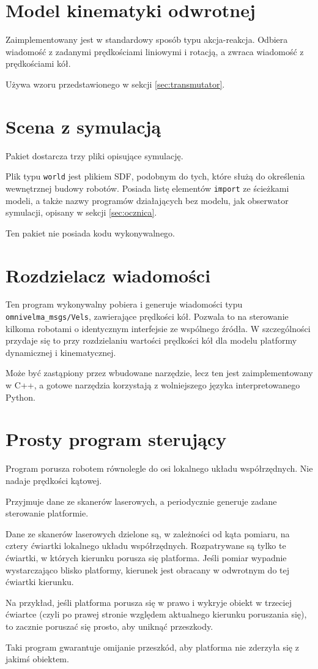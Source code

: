 \section{Model kinematyki odwrotnej}
	Zaimplementowany jest w standardowy sposób typu akcja-reakcja.
	Odbiera wiadomość z zadanymi prędkościami liniowymi i rotacją, a zwraca wiadomość z prędkościami kół.
	
	Używa wzoru przedstawionego w sekcji \ref{sec:transmutator}.
	
\section{Scena z symulacją}
	Pakiet dostarcza trzy pliki opisujące symulację.

	Plik typu \texttt{world} jest plikiem SDF, podobnym do tych, które służą do określenia wewnętrznej budowy robotów.
	Posiada listę elementów \texttt{import} ze ścieżkami modeli, a także nazwy programów działających bez modelu, jak obserwator symulacji, opisany w sekcji \ref{sec:ocznica}.
	
	Ten pakiet nie posiada kodu wykonywalnego.

\section{Rozdzielacz wiadomości}
	Ten program wykonywalny pobiera i generuje wiadomości typu \texttt{omnivelma\_msgs/Vels}, zawierające prędkości kół.
	Pozwala to na sterowanie kilkoma robotami o identycznym interfejsie ze wspólnego źródła.
	W szczególności przydaje się to przy rozdzielaniu wartości prędkości kół dla modelu platformy dynamicznej i kinematycznej.
	
	Może być zastąpiony przez wbudowane narzędzie, lecz ten jest zaimplementowany w C++, a gotowe narzędzia korzystają z wolniejszego języka interpretowanego Python.

\section{Prosty program sterujący}
	Program porusza robotem równolegle do osi lokalnego układu współrzędnych.
	Nie nadaje prędkości kątowej.
	
	Przyjmuje dane ze skanerów laserowych, a periodycznie generuje zadane sterowanie platformie.

	Dane ze skanerów laserowych dzielone są, w zależności od kąta pomiaru, na cztery ćwiartki lokalnego układu współrzędnych.
	Rozpatrywane są tylko te ćwiartki, w których kierunku porusza się platforma.
	Jeśli pomiar wypadnie wystarczająco blisko platformy, kierunek jest obracany w odwrotnym do tej ćwiartki kierunku.
	
	Na przykład, jeśli platforma porusza się w prawo i wykryje obiekt w trzeciej ćwiartce (czyli po prawej stronie względem aktualnego kierunku poruszania się),
	to zacznie poruszać się prosto, aby uniknąć przeszkody.
	
	Taki program gwarantuje omijanie przeszkód, aby platforma nie zderzyła się z jakimś obiektem.
